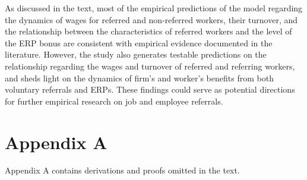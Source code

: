 \documentclass[12pt]{article}
\begin{document}
As discussed in the text, most of the empirical predictions of the model regarding the dynamics of wages for referred and non-referred workers, their turnover, and the relationship between the characteristics of referred workers and the level of the ERP bonus are consistent with empirical evidence documented in the literature.  However, the study also generates testable predictions on the relationship regarding the wages and turnover of referred and referring workers, and sheds light on the dynamics of firm's and worker's benefits from both voluntary referrals and ERPs. These findings could serve as potential directions for further empirical research on job and employee referrals.

\singlespacing
\setlength\bibsep{0pt}





\clearpage

\onehalfspacing










\clearpage

\section*{Appendix A} \label{sec:appendixa}
Appendix A contains derivations and proofs omitted in the text.
\end{document}
